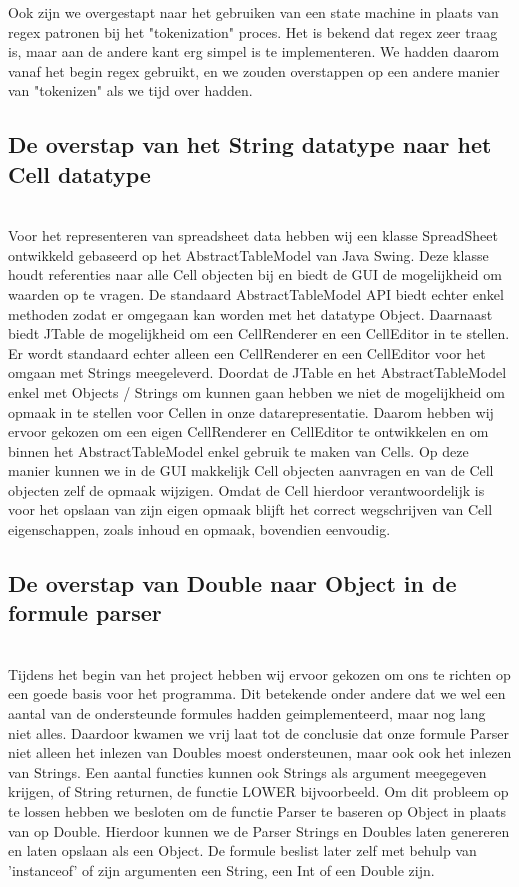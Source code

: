 \documentclass[a4paper,11pt]{article}
\begin{document}
Ook zijn we overgestapt naar het gebruiken van een state machine in plaats van regex patronen bij het "tokenization" proces. 
Het is bekend dat regex zeer traag is, maar aan de andere kant erg simpel is te implementeren. 
We hadden daarom vanaf het begin regex gebruikt, en we zouden overstappen op een andere manier van "tokenizen" als we tijd over hadden.

\subsection{De overstap van het String datatype naar het Cell datatype}\mbox{}\\
Voor het representeren van spreadsheet data hebben wij een klasse SpreadSheet ontwikkeld gebaseerd op het AbstractTableModel van Java Swing.
Deze klasse houdt referenties naar alle Cell objecten bij en biedt de GUI de mogelijkheid om waarden op te vragen.
De standaard AbstractTableModel API biedt echter enkel methoden zodat er omgegaan kan worden met het datatype Object.
Daarnaast biedt JTable de mogelijkheid om een CellRenderer en een CellEditor in te stellen.
Er wordt standaard echter alleen een CellRenderer en een CellEditor voor het omgaan met Strings meegeleverd.
Doordat de JTable en het AbstractTableModel enkel met Objects / Strings om kunnen gaan hebben we niet de mogelijkheid om opmaak in te stellen voor Cellen in onze datarepresentatie.
Daarom hebben wij ervoor gekozen om een eigen CellRenderer en CellEditor te ontwikkelen en om binnen het AbstractTableModel enkel gebruik te maken van Cells.
Op deze manier kunnen we in de GUI makkelijk Cell objecten aanvragen en van de Cell objecten zelf de opmaak wijzigen.
Omdat de Cell hierdoor verantwoordelijk is voor het opslaan van zijn eigen opmaak blijft het correct wegschrijven van Cell eigenschappen, zoals inhoud en opmaak, bovendien eenvoudig.

\subsection{De overstap van Double naar Object in de formule parser}\mbox{}\\
Tijdens het begin van het project hebben wij ervoor gekozen om ons te richten op een goede basis voor het programma. Dit betekende onder andere dat we wel een aantal van de ondersteunde formules hadden geimplementeerd, maar nog lang niet alles. Daardoor kwamen we vrij laat tot de conclusie dat onze formule Parser niet alleen het inlezen van Doubles moest ondersteunen, maar ook ook het inlezen van Strings. Een aantal functies kunnen ook Strings als argument meegegeven krijgen, of String returnen, de functie LOWER bijvoorbeeld. Om dit probleem op te lossen hebben we besloten om de functie Parser te baseren op Object in plaats van op Double. Hierdoor kunnen we de Parser Strings en Doubles laten genereren en laten opslaan als een Object. De formule beslist later zelf met behulp van 'instanceof' of zijn argumenten een String, een Int of een Double zijn.
\end{document}

